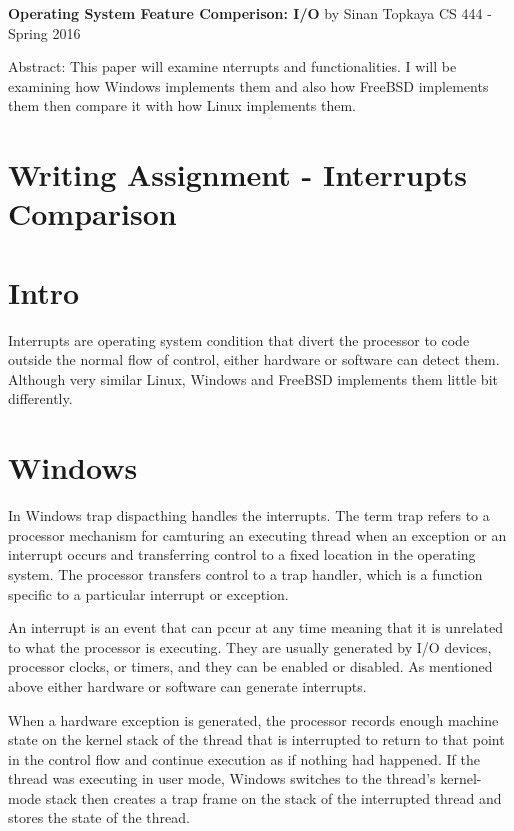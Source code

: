 \documentclass[letterpaper,10pt,draftclsnofoot,onecolumn]{IEEEtran}
\begin{document}
	\begin{titlepage}
		
		\begin{center}
		\bigbreak	
		\textbf{Operating System Feature Comperison: I/O}
		\bigbreak
		by Sinan Topkaya
		\smallbreak
		CS 444 - Spring 2016
		\end{center}
		\vfill
		
		Abstract: This paper will examine nterrupts and functionalities. I will be examining how Windows implements them and also how FreeBSD implements them then compare it with how Linux implements them. 
		
	\end{titlepage}

\section*{Writing Assignment - Interrupts Comparison}
\section*{Intro}

Interrupts are operating system condition that divert the processor to code outside the normal flow of control, either hardware or software can detect them. Although very similar Linux, Windows and FreeBSD implements them little bit differently. 

\section*{Windows}

In Windows trap dispacthing handles the interrupts. The term trap refers to a processor mechanism for camturing an executing thread when an exception or an interrupt occurs and transferring control to a fixed location in the operating system. The processor transfers control to a trap handler, which is a function specific to a particular interrupt or exception.\cite{[1]}

An interrupt is an event that can pccur at any time meaning that it is unrelated to what the processor is executing. They are usually generated by I/O devices, processor clocks, or timers, and they can be enabled or disabled. As mentioned above either hardware or software can generate interrupts.

When a hardware exception is generated, the processor records enough machine state on the kernel stack of the thread that is interrupted to return to that point in the control flow and continue execution as if nothing had happened. If the thread was executing in user mode, Windows switches to the thread's kernel-mode stack then creates a trap frame on the stack of the interrupted thread and stores the state of the thread.\cite{[1]}
\end{document}
